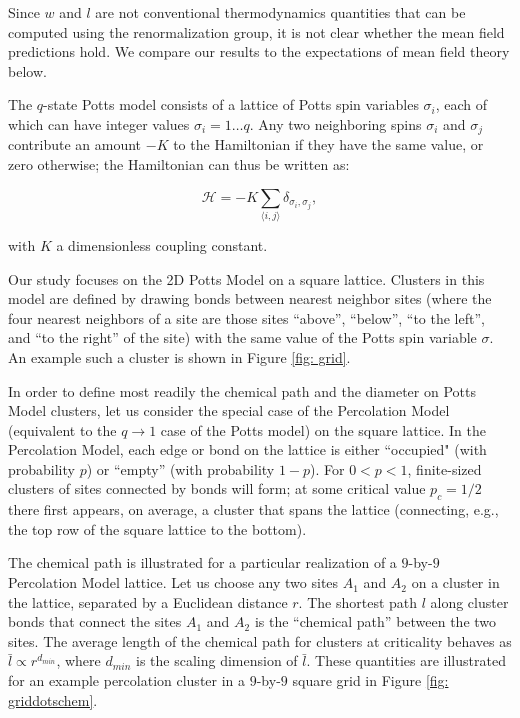 \documentclass[pre,preprint]{revtex4}
\newcommand{\lb}{{\langle}}
\newcommand{\rb}{{\rangle}}
\begin{document}
Since $w$ and $l$ are not conventional thermodynamics quantities that can be computed using the renormalization group, it is not clear whether the mean field predictions hold.  We compare our results to the expectations of mean field theory below.



The $q$-state Potts model consists of a lattice of Potts spin variables $\sigma_i$, each of which can have integer values $\sigma_i = 1 \dots q$.  Any two neighboring spins $\sigma_i$ and $\sigma_j$ contribute an amount $-K$ to the Hamiltonian if they have the same value, or zero otherwise; the Hamiltonian can thus be written as:

\begin{equation}
\mathcal{H} = -K \sum_{\lb i,j \rb} \delta_{\sigma_i, \sigma_j},
\end{equation}     

with $K$ a dimensionless coupling constant.  

Our study focuses on the 2D Potts Model on a square lattice.  Clusters in this model are defined by drawing bonds between nearest neighbor sites (where the four nearest neighbors of a site are those sites ``above'', ``below'', ``to the left'', and ``to the right'' of the site) with the same value of the Potts spin variable $\sigma$.  An example such a cluster is shown in Figure \ref{fig: grid}.

In order to define most readily the chemical path and the diameter on Potts Model clusters, let us consider the special case of the Percolation Model (equivalent to the $q \to 1$ case of the Potts model) on the square lattice.  In the Percolation Model, each edge or bond on the lattice is either ``occupied" (with probability $p$) or ``empty'' (with probability $1-p$). For $0 < p < 1$, finite-sized clusters of sites connected by bonds will form; at some critical value $p_c = 1/2$ there first appears, on average, a cluster that spans the lattice \cite{Stau96} (connecting, e.g., the top row of the square lattice to the bottom). 

The chemical path is illustrated for a particular realization of a $9$-by-$9$ Percolation Model lattice.  Let us choose any two sites $A_1$ and $A_2$ on a cluster in the lattice, separated by a Euclidean distance $r$.  The shortest path $l$ along cluster bonds that connect the sites $A_1$ and $A_2$ is the ``chemical path'' \cite{HrHoSt84} between the two sites.  The average length of the chemical path for clusters at criticality behaves as $\bar{l} \propto r^{d_{min}}$, where $d_{min}$ is the scaling dimension of $\bar{l}$. These quantities are illustrated for an example percolation cluster in a $9$-by-$9$ square grid in Figure \ref{fig: griddotschem}.
\end{document}
